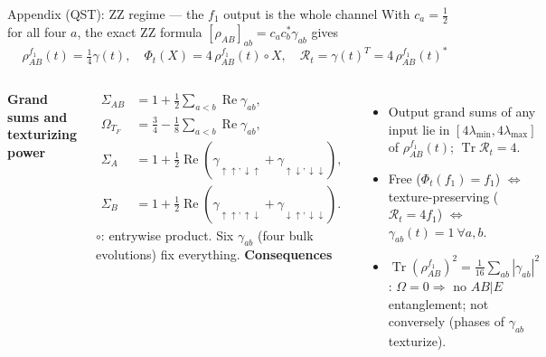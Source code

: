 \documentclass[aspectratio=169,10pt]{beamer}
\newcommand{\Tr}{\operatorname{Tr}}
\newcommand{\sechead}[1]{{\color{sea}\bfseries #1}\par\vspace{1mm}}
\begin{document}
\begin{frame}{Appendix (QST): ZZ regime --- the \(f_1\) output is the whole channel}
With \(c_a=\tfrac12\) for all four \(a\), the exact ZZ formula \([\rho_{AB}]_{ab}=c_ac_b^*\gamma_{ab}\) gives
\[
\boxed{\rho^{f_1}_{AB}(t)=\tfrac14\gamma(t),\quad \Phi_t(X)=4\,\rho^{f_1}_{AB}(t)\circ X,\quad \mathcal R_t=\gamma(t)^T=4\,\rho^{f_1}_{AB}(t)^*}
\]
\vspace{-.1cm}
\begin{columns}[T,onlytextwidth]
\sechead{Grand sums and texturizing power}
\[
\begin{aligned}
\Sigma_{AB}&=1+\tfrac12\textstyle\sum_{a<b}\operatorname{Re}\gamma_{ab},\\
\Omega_{T_F}&=\tfrac34-\tfrac18\textstyle\sum_{a<b}\operatorname{Re}\gamma_{ab},\\
\Sigma_A&=1+\tfrac12\operatorname{Re}(\gamma_{\uparrow\uparrow,\downarrow\uparrow}+\gamma_{\uparrow\downarrow,\downarrow\downarrow}),\\
\Sigma_B&=1+\tfrac12\operatorname{Re}(\gamma_{\uparrow\uparrow,\uparrow\downarrow}+\gamma_{\downarrow\uparrow,\downarrow\downarrow}).
\end{aligned}
\]
\(\circ\): entrywise product. Six \(\gamma_{ab}\) (four bulk evolutions) fix everything.
\sechead{Consequences}
\begin{itemize}\setlength\itemsep{2pt}
\item Output grand sums of any input lie in \([4\lambda_{\min},4\lambda_{\max}]\) of \(\rho^{f_1}_{AB}(t)\); \(\Tr\mathcal R_t=4\).
\item Free (\(\Phi_t(f_1)=f_1\)) \(\Leftrightarrow\) texture-preserving (\(\mathcal R_t=4f_1\)) \(\Leftrightarrow\) \(\gamma_{ab}(t)=1\ \forall a,b\).
\item \(\Tr(\rho^{f_1}_{AB})^2=\tfrac1{16}\sum_{ab}|\gamma_{ab}|^2\): \(\Omega=0\Rightarrow\) no \(AB|E\) entanglement; not conversely (phases of \(\gamma_{ab}\) texturize).
\end{itemize}
\end{columns}
\end{frame}
\end{document}
